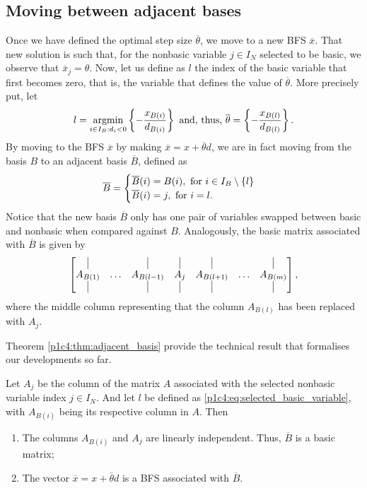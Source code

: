 \subsection{Moving between adjacent bases}

Once we have defined the optimal step size $\overline{\theta}$, we move to a new BFS $\overline{x}$. That new solution is such that, for the nonbasic variable $j \in I_N$ selected to be basic, we observe that $\overline{x}_j = \theta$. Now, let us define as $l$ the index of the basic variable that first becomes zero, that is, the variable that defines the value of $\overline{\theta}$. More precisely put, let 
%
\begin{equation}
	l = \mathop{\rm argmin}_{i \in I_B : d_i <0}	\left\{ -\frac{x_{B(i)}}{d_{B(i)}} \right \} \text{ and, thus, } \overline{\theta} = \left\{ -\frac{x_{B(l)}}{d_{B(l)}} \right \}. \label{p1c4:eq:selected_basic_variable}	
\end{equation}
%
By moving to the BFS $\overline{x}$ by making $\overline{x} = x + \overline{\theta}d$, we are in fact moving from the basis $B$ to an adjacent basis $\overline{B}$, defined as
%
\begin{equation*}
	\overline{B} = 
		\begin{cases} 
			\overline{B}(i) = B(i), \text{ for }i \in I_B \setminus \left\{ l \right \} \\
			\overline{B}(i) = j, \text{ for } i = l. 
		\end{cases}
\end{equation*}
%
Notice that the new basis $\overline{B}$ only has one pair of variables swapped between basic and nonbasic when compared against $B$. Analogously, the basic matrix associated with $\overline{B}$ is given by 
%
\begin{equation*}
	\begin{bmatrix}
		\vline   &  & \vline & \vline & \vline &  & \vline \\
		A_{B(1)} & \dots & A_{B(l-1)} & A_j &  A_{B(l+1)} & \dots & A_{B(m)} \\
		\vline   &  & \vline & \vline & \vline &  & \vline 
	\end{bmatrix},	
\end{equation*}
%
where the middle column representing that the column $A_{B(l)}$ has been replaced with $A_j$. 

Theorem \ref{p1c4:thm:adjacent_basis} provide the technical result that formalises our developments so far.

\begin{theorem} \label{p1c4:thm:adjacent_basis}
	Let $A_j$ be the column of the matrix $A$ associated with the selected nonbasic variable index $j \in I_N$. And let $l$ be defined as \eqref{p1c4:eq:selected_basic_variable}, with $A_{B(i)}$ being its respective column in $A$. Then	 
	\begin{enumerate}
		\item The columns $A_{B(i)}$ and $A_j$ are linearly independent. Thus, $\overline{B}$ is a basic matrix;
		\item The vector $\overline{x} = x + \overline{\theta}d$ is a BFS associated with $\overline{B}$.
	\end{enumerate}
\end{theorem}

